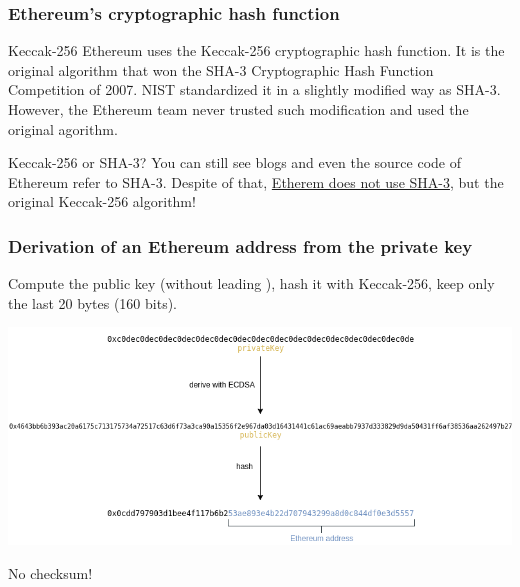 \documentclass[11pt]{beamer}  %
\def\codesize{\smaller}
\def\<#1>{\codeid{#1}}
\newcommand{\codeid}[1]{\ifmmode{\mbox{\codesize\ttfamily{#1}}}\else{\codesize\ttfamily #1}\fi}
\begin{document}
\begin{frame}\frametitle{Ethereum's cryptographic hash function}

  \begin{greenbox}{Keccak-256}
    Ethereum uses the Keccak-256 cryptographic hash function.
    It is the original algorithm that won the SHA-3 Cryptographic Hash
    Function Competition of 2007. NIST standardized it in a slightly
    modified way as SHA-3. However, the Ethereum team never trusted
    such modification and used the original agorithm.
  \end{greenbox}

  \bigskip

  \begin{redbox}{Keccak-256 or SHA-3?}
    You can still see blogs and even the source code of Ethereum refer
    to SHA-3. Despite of that, \underline{Etherem does not use SHA-3}, but the original
    Keccak-256 algorithm!
  \end{redbox}

\end{frame}

\begin{frame}\frametitle{Derivation of an Ethereum address from the private key}

  \begin{greenbox}{}
    Compute the public key (without leading \<0x04>),
    hash it with Keccak-256, keep only the last 20 bytes (160 bits).
  \end{greenbox}
  
  \begin{center}
    \includegraphics[width=\textwidth,clip=false]{pictures/ethereum-address-derivation.png}
  \end{center}

  \begin{center}
    No checksum!
  \end{center}

\end{frame}
\end{document}
